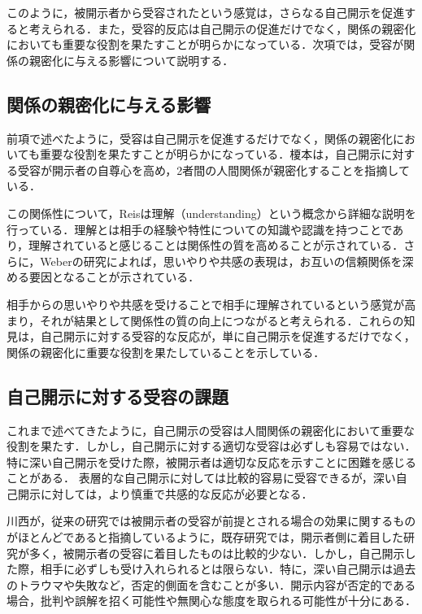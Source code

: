 このように，被開示者から受容されたという感覚は，さらなる自己開示を促進すると考えられる．また，受容的反応は自己開示の促進だけでなく，関係の親密化においても重要な役割を果たすことが明らかになっている．次項では，受容が関係の親密化に与える影響について説明する．



\subsection{関係の親密化に与える影響}\label{}

前項で述べたように，受容は自己開示を促進するだけでなく，関係の親密化においても重要な役割を果たすことが明らかになっている．榎本は，自己開示に対する受容が開示者の自尊心を高め，2者間の人間関係が親密化することを指摘している．

この関係性について，Reis\cite{reis_2017}は理解（understanding）という概念から詳細な説明を行っている．理解とは相手の経験や特性についての知識や認識を持つことであり，理解されていると感じることは関係性の質を高めることが示されている．さらに，Weberの研究によれば，思いやりや共感の表現は，お互いの信頼関係を深める要因となることが示されている．

相手からの思いやりや共感を受けることで相手に理解されているという感覚が高まり，それが結果として関係性の質の向上につながると考えられる．これらの知見は，自己開示に対する受容的な反応が，単に自己開示を促進するだけでなく，関係の親密化に重要な役割を果たしていることを示している．


\subsection{自己開示に対する受容の課題}\label{受容の課題}
これまで述べてきたように，自己開示の受容は人間関係の親密化において重要な役割を果たす．しかし，自己開示に対する適切な受容は必ずしも容易ではない．特に深い自己開示を受けた際，被開示者は適切な反応を示すことに困難を感じることがある．
表層的な自己開示に対しては比較的容易に受容できるが，深い自己開示に対しては，より慎重で共感的な反応が必要となる．

川西が，従来の研究では被開示者の受容が前提とされる場合の効果に関するものがほとんどであると指摘しているように，既存研究では，開示者側に着目した研究が多く，被開示者の受容に着目したものは比較的少ない．しかし，自己開示した際，相手に必ずしも受け入れられるとは限らない．特に，深い自己開示は過去のトラウマや失敗など，否定的側面を含むことが多い．開示内容が否定的である場合，批判や誤解を招く可能性や無関心な態度を取られる可能性が十分にある．
